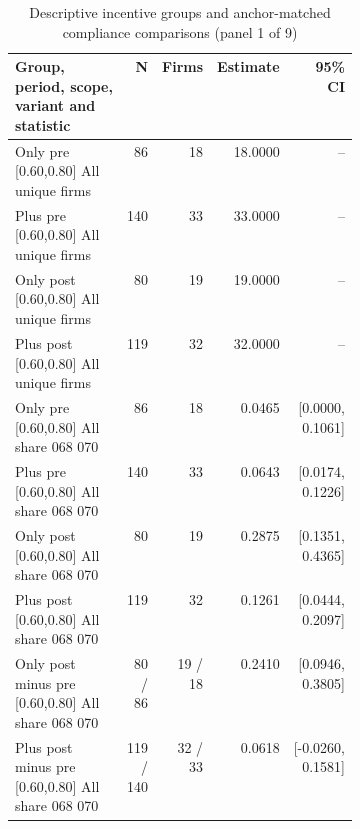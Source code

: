 \begin{table}[!htbp]\centering\scriptsize
\caption{Descriptive incentive groups and anchor-matched compliance comparisons (panel 1 of 9)}
\begin{threeparttable}
\begin{tabular}{p{0.40\linewidth}rrrr}
\toprule
Group, period, scope, variant and statistic & N & Firms & Estimate & 95\% CI \\
\midrule
Only pre [0.60,0.80] All unique firms & 86 & 18 & 18.0000 & -- \\
Plus pre [0.60,0.80] All unique firms & 140 & 33 & 33.0000 & -- \\
Only post [0.60,0.80] All unique firms & 80 & 19 & 19.0000 & -- \\
Plus post [0.60,0.80] All unique firms & 119 & 32 & 32.0000 & -- \\
Only pre [0.60,0.80] All share 068 070 & 86 & 18 & 0.0465 & [0.0000, 0.1061] \\
Plus pre [0.60,0.80] All share 068 070 & 140 & 33 & 0.0643 & [0.0174, 0.1226] \\
Only post [0.60,0.80] All share 068 070 & 80 & 19 & 0.2875 & [0.1351, 0.4365] \\
Plus post [0.60,0.80] All share 068 070 & 119 & 32 & 0.1261 & [0.0444, 0.2097] \\
Only post minus pre [0.60,0.80] All share 068 070 & 80 / 86 & 19 / 18 & 0.2410 & [0.0946, 0.3805] \\
Plus post minus pre [0.60,0.80] All share 068 070 & 119 / 140 & 32 / 33 & 0.0618 & [-0.0260, 0.1581] \\
\bottomrule
\end{tabular}
\begin{tablenotes}[flushleft]\footnotesize

\end{tablenotes}
\end{threeparttable}
\end{table}
